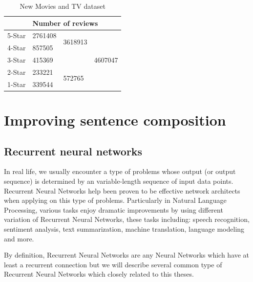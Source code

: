 \begin{table}[H]
	\centering
	\caption{New Movies and TV dataset}
	\label{table:moviereview}
	\begin{tabular}{@{}lllc@{}}
		\toprule
		& \multicolumn{3}{l}{Number of reviews}                         \\ \midrule
		5-Star & 2761408 & \multirow{2}{*}{3618913} & \multirow{5}{*}{4607047} \\ \cmidrule(r){1-2}
		4-Star & 857505  &                          &                          \\ \cmidrule(r){1-3}
		3-Star & \multicolumn{2}{l}{415369}         &                          \\ \cmidrule(r){1-3}
		2-Star & 233221  & \multirow{2}{*}{572765}  &                          \\ \cmidrule(r){1-2}
		1-Star & 339544  &                          &                          \\ \bottomrule
	\end{tabular}
\end{table}


\section{Improving sentence composition}
\subsection{Recurrent neural networks}\label{sec:RNN}
In real life, we usually encounter a type of problems whose output (or output sequence) is determined by an variable-length sequence of input data points. 
Recurrent Neural Networks help been proven to be effective network architects when applying on this type of problems.  
Particularly in Natural Language Processing, various tasks enjoy dramatic improvements by using different variation of Recurrent Neural Networks, these tasks including:  speech recognition\cite{speech-lstm}\cite{MiaoGM15}, sentiment analysis\cite{treeLSTM}\cite{cnn-rnn}\cite{attention-gru}, text summarization\cite{RushCW15}\cite{NallapatiXZ16}, machine translation\cite{FiratCB16}\cite{SutskeverVL14}\cite{BritzGLL17}, language modeling\cite{mikolov-nlm}\cite{JozefowiczVSSW16} and more\cite{deep-nlp}\cite{Schmidhuber14}\cite{deeplearning-book}.

By definition, Recurrent Neural Networks are any Neural Networks which have at least a recurrent connection\cite{rnn-def} but we will describe several common type of Recurrent Neural Networks which closely related to this theses.

